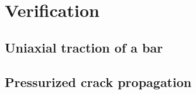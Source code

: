 \section{Verification}
\label{section brittle/verification}

\subsection{Uniaxial traction of a bar}

\subsection{Pressurized crack propagation}

